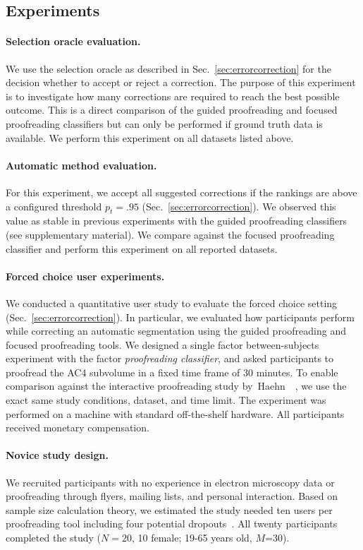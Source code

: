 \subsection{Experiments}

\paragraph{Selection oracle evaluation.} We use the selection oracle as described in Sec.~\ref{sec:errorcorrection} for the decision whether to accept or reject a correction. The purpose of this experiment is to investigate how many corrections are required to reach the best possible outcome. This is a direct comparison of the guided proofreading and focused proofreading classifiers but can only be performed if ground truth data is available. We perform this experiment on all datasets listed above.

\paragraph{Automatic method evaluation.} For this experiment, we accept all suggested corrections if the rankings are above a configured threshold $p_t=.95$ (Sec.~\ref{sec:errorcorrection}). We observed this value as stable in previous experiments with the guided proofreading classifiers (see supplementary material). We compare against the focused proofreading classifier and perform this experiment on all reported datasets.

\paragraph{Forced choice user experiments.} We conducted a quantitative user study to evaluate the forced choice setting (Sec.~\ref{sec:errorcorrection}). In particular, we evaluated how participants perform while correcting an automatic segmentation using the guided proofreading and focused proofreading tools. We designed a single factor between-subjects experiment with the factor \textit{proofreading classifier}, and asked participants to proofread the AC4 subvolume in a fixed time frame of 30 minutes.
To enable comparison against the interactive proofreading study by~Haehn~\etal~\cite{haehn_dojo_2014}, we use the exact same study conditions, dataset, and time limit. The experiment was performed on a machine with standard off-the-shelf hardware. All participants received monetary compensation.

\paragraph{Novice study design.} We recruited participants with no experience in electron microscopy data or proofreading through flyers, mailing lists, and personal interaction. Based on sample size calculation theory, we estimated the study needed ten users per proofreading tool including four potential dropouts~\cite{samplesize1,samplesize2}. All twenty participants completed the study ($N=20$, 10 female; 19-65 years old, $M$=30). 

